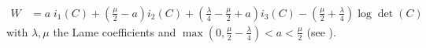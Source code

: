 \documentclass[a4paper,11pt,english]{sphinxmanual}
\begin{document}
\subsubsection{}
\label{\detokenize{userdoc/model_nonlinear_elasticity:ciarlet-geymonat-law}}\begin{equation*}
\begin{split}{W} &= a\; i_1(C) + (\frac{\mu}{2} - a)i_2(C) + (\frac{\lambda}{4} - \frac{\mu}{2} + a)i_3(C) - (\frac{\mu}{2}+\frac{\lambda}{4})\log \det(C)\end{split}
\end{equation*}
with  \(\lambda, \mu\) the Lame coefficients and \(\max(0,\frac{\mu}{2}-\frac{\lambda}{4})<a<\frac{\mu}{2}\) (see ).
\end{document}
